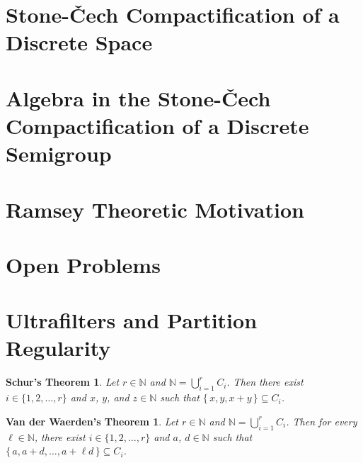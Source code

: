 \documentclass[12pt]{article}
\theoremstyle{plain}
\newtheorem*{vdw}{Van der Waerden's Theorem}
\newtheorem*{schur}{Schur's Theorem}
\theoremstyle{definition}
\newcommand{\bbN}{\mathbb{N}}
\newcommand{\calR}{\mathcal{R}}
\begin{document}
\section{Stone-\v{C}ech Compactification of a Discrete Space}
\section{Algebra in the Stone-\v{C}ech Compactification of a Discrete Semigroup}
\section{Ramsey Theoretic Motivation}
\section*{Open Problems}
\section{Ultrafilters and Partition Regularity}


\begin{schur}
  Let $r \in \bbN$ and $\bbN = \bigcup_{i=1}^r C_i$.
  Then there exist $i \in \{1, 2, \ldots, r\}$ and $x$, $y$, and $z
  \in \bbN$ such that $\{\, x, y, x+y \,\} \subseteq C_i$.
\end{schur}

\begin{vdw}
  Let $r \in \bbN$ and $\bbN = \bigcup_{i=1}^r C_i$.
  Then for every $\ell \in \bbN$, there exist $i \in \{1, 2, \ldots,
  r\}$ and $a$, $d \in \bbN$ such that $\{\, a, a+d, \ldots, a+\ell d
  \,\} \subseteq C_i$.
\end{vdw}

\theendnotes



\end{document}

